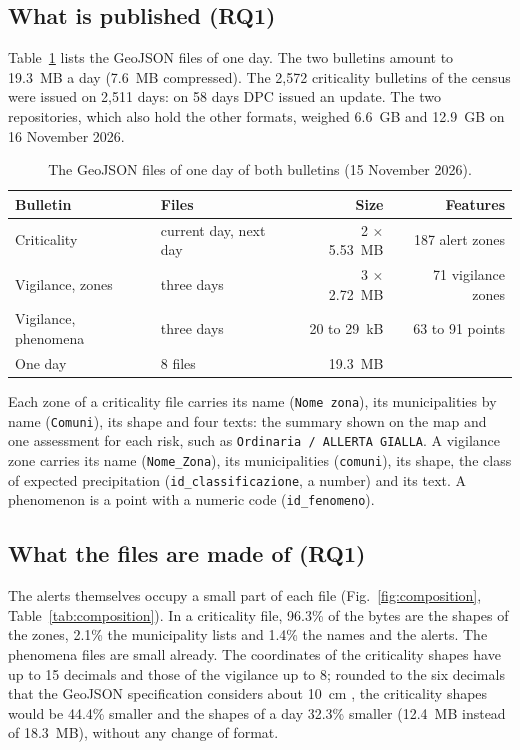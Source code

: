 \documentclass[review,authoryear,12pt]{elsarticle}
\newcommand{\field}[1]{\texttt{#1}}
\begin{document}
\subsection{What is published (RQ1)}

Table~\ref{tab:day} lists the GeoJSON files of one day. The two bulletins
amount to 19.3~MB a day (7.6~MB compressed). The 2,572 criticality bulletins
of the census were issued on 2,511 days: on 58 days DPC issued an update. The
two repositories, which also hold the other formats, weighed 6.6~GB and
12.9~GB on 16 November 2026.

\begin{table}[t]
\centering
\caption{The GeoJSON files of one day of both bulletins (15 November 2026).}
\label{tab:day}
\small
\begin{tabular}{@{}llrr@{}}
\toprule
Bulletin & Files & Size & Features \\
\midrule
Criticality & current day, next day & 2 $\times$ 5.53~MB & 187 alert zones \\
Vigilance, zones & three days & 3 $\times$ 2.72~MB & 71 vigilance zones \\
Vigilance, phenomena & three days & 20 to 29~kB & 63 to 91 points \\
\midrule
One day & 8 files & 19.3~MB & \\
\bottomrule
\end{tabular}
\end{table}

Each zone of a criticality file carries its name (\field{Nome zona}), its
municipalities by name (\field{Comuni}), its shape and four texts: the
summary shown on the map and one assessment for each risk, such as
\field{Ordinaria / ALLERTA GIALLA}. A vigilance zone carries its name
(\field{Nome\_Zona}), its municipalities (\field{comuni}), its shape, the class
of expected precipitation (\field{id\_classificazione}, a number) and its text.
A phenomenon is a point with a numeric code (\field{id\_fenomeno}).

\subsection{What the files are made of (RQ1)}

The alerts themselves occupy a small part of each file
(Fig.~\ref{fig:composition}, Table~\ref{tab:composition}). In a criticality
file, 96.3\% of the bytes are the shapes of the zones, 2.1\% the municipality
lists and 1.4\% the names and the alerts. The phenomena files are small
already. The coordinates of the criticality shapes have up to 15 decimals and
those of the vigilance up to 8; rounded to the six decimals that the GeoJSON
specification considers about 10~cm \citep{butler2016}, the criticality shapes
would be 44.4\% smaller and the shapes of a day 32.3\% smaller (12.4~MB instead
of 18.3~MB), without any change of format.
\end{document}

